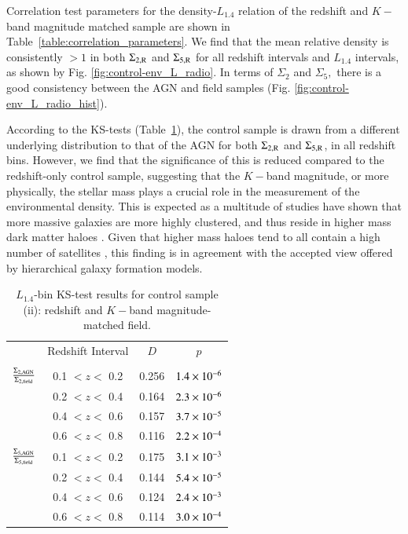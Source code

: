 Correlation test parameters for the density-$L_{1.4}$ relation of the redshift and $K-$band magnitude matched sample are shown in Table~\ref{table:correlation_parameters}.
We find that the mean relative density is consistently $>1$ in both $\Sigma_{2,\rm{R}}$ and $\Sigma_{5,\rm{R}}$ for all redshift intervals and $L_{1.4}$ intervals, as shown by Fig. \ref{fig:control-env_L_radio}. In terms of $\Sigma_2$ and $\Sigma_5,$ there is a good consistency between the AGN and field samples (Fig. \ref{fig:control-env_L_radio_hist}). 

According to the KS-tests (Table~\ref{table:sample2b}), the control sample is drawn from a different underlying distribution to that of the AGN for both $\Sigma_{2,\rm{R}}$ and $\Sigma_{5,\rm{R}}$, in all redshift bins. However, we find that the significance of this is reduced compared to the redshift-only control sample, suggesting that the $K-$band magnitude, or more physically, the stellar mass plays a crucial role in the measurement of the environmental density. This is expected as a multitude of studies have shown that more massive galaxies are more highly clustered, and thus reside in higher mass dark matter haloes \citep[e.g.][]{Norberg2002,Zehavi2011}. Given that higher mass haloes tend to all contain a high number of satellites \citep{mccracken2015,Hatfield2016}, this finding is in agreement with the accepted view offered by hierarchical galaxy formation models.

\begin{table}
\centering
\caption[Sample (ii): L$_{1.4}$-bin KS-test results]{$L_{1.4}$-bin KS-test results for control sample (ii): redshift and $K-$band magnitude-matched field.}
\label{table:sample2b}
\begin{tabular}{c | c c c}
\hline \hline
  & Redshift Interval & $D$ & $p$ \\
  & & & \\
  \hline
   	$\frac{\Sigma_{2,{\rm AGN}}}{\Sigma_{2,{\rm field}}}$	& 0.1 $< z <$ 0.2 	&	0.256  &  $1.4\times 10^{-6}$ \\
   							& 0.2 $< z <$ 0.4 	& 	0.164  &  $2.3\times 10^{-6}$ \\
   							& 0.4 $< z <$ 0.6 	&	0.157  &  $3.7\times 10^{-5}$ \\
   							& 0.6 $< z <$ 0.8 	&	0.116  &  $2.2\times 10^{-4}$ \\
  \hline
   $\frac{\Sigma_{5,{\rm AGN}}}{\Sigma_{5,{\rm field}}}$	& 0.1 $< z <$ 0.2 	& 	0.175  &  $3.1\times 10^{-3}$ \\
   							& 0.2 $< z <$ 0.4 	& 	0.144  &  $5.4\times 10^{-5}$ \\
   							& 0.4 $< z <$ 0.6 	& 	0.124  &  $2.4\times 10^{-3}$ \\
   							& 0.6 $< z <$ 0.8 	& 	0.114  &  $3.0\times 10^{-4}$ \\               
  \hline
  \end{tabular}
\end{table}

